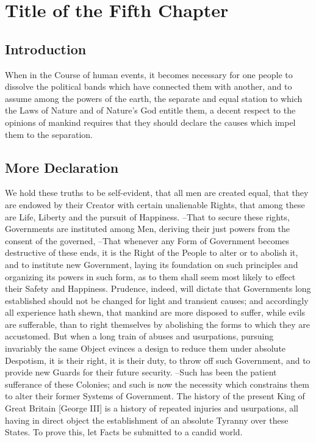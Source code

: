 \chapter{Title of the Fifth Chapter}

\section{Introduction}
When in the Course of human events, it becomes necessary for one people  to dissolve the political bands which have connected them with another,  and to assume among the powers of the earth, the separate and equal station  to which the Laws of Nature and of Nature's God entitle them, a decent respect to the opinions of mankind requires that they should declare  the causes which impel them to the separation.

\section{More Declaration}

We hold these truths to be self-evident, that all men are created equal,  that they are endowed by their Creator with certain unalienable Rights,  that among these are Life, Liberty and the pursuit of Happiness. --That to secure these  rights, Governments are instituted among Men, deriving their just powers  from the consent of the governed, --That whenever any Form of Government  becomes destructive of these ends, it is the Right of the People to alter  or to abolish it, and to institute new Government, laying its foundation on  such principles and organizing its powers in such form, as to them shall  seem most likely to effect their Safety and Happiness. Prudence, indeed, will dictate that Governments long established should not  be changed for light and transient causes; and accordingly all experience  hath shewn, that mankind are more disposed to suffer, while evils are  sufferable, than to right themselves by abolishing the forms to which they  are accustomed. But when a long train of abuses and usurpations, pursuing invariably the same  Object evinces a design to reduce them under absolute Despotism, it is their  right, it is their duty, to throw off such Government, and to provide new Guards for their future security. --Such has been the patient sufferance of these Colonies; and such is now the  necessity which constrains them to alter their former Systems of Government.  The history of the present King of Great Britain [George III] is a history  of repeated injuries and usurpations, all having in direct object the  establishment of an absolute Tyranny over these States. To prove this, let Facts be submitted to a candid world.